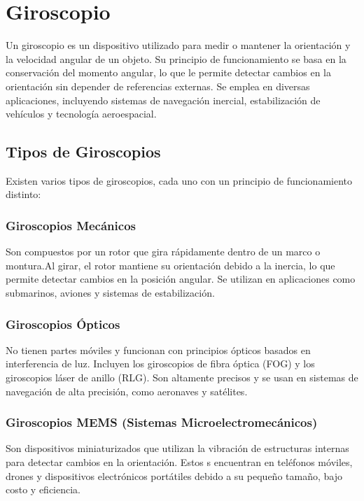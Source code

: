 \section{\textbf{Giroscopio}} 
Un giroscopio es un dispositivo utilizado para medir o mantener la orientación y la velocidad angular de un objeto. Su principio de funcionamiento se basa en la conservación del momento angular, lo que le permite detectar cambios en la orientación sin depender de referencias externas. Se emplea en diversas aplicaciones, incluyendo sistemas de navegación inercial, estabilización de vehículos y tecnología aeroespacial.
\subsection{\textbf{Tipos de Giroscopios}}
Existen varios tipos de giroscopios, cada uno con un principio de funcionamiento distinto:

\subsubsection{\textbf{Giroscopios Mecánicos}}
Son compuestos por un rotor que gira rápidamente dentro de un marco o montura.Al girar, el rotor mantiene su orientación debido a la inercia, lo que permite detectar cambios en la posición angular. Se utilizan en aplicaciones como submarinos, aviones y sistemas de estabilización.


\subsubsection{\textbf{Giroscopios Ópticos}}

No tienen partes móviles y funcionan con principios ópticos basados en interferencia de luz. Incluyen los giroscopios de fibra óptica (FOG) y los giroscopios láser de anillo (RLG). Son altamente precisos y se usan en sistemas de navegación de alta precisión, como aeronaves y satélites.


\subsubsection{\textbf{Giroscopios MEMS (Sistemas Microelectromecánicos)}}

Son dispositivos miniaturizados que utilizan la vibración de estructuras internas para detectar cambios en la orientación. Estos s encuentran en teléfonos móviles, drones y dispositivos electrónicos portátiles debido a su pequeño tamaño, bajo costo y eficiencia.


